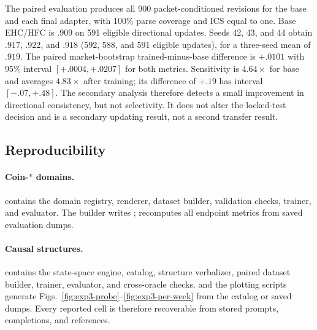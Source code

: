 The paired evaluation produces all 900 packet-conditioned revisions for the base
and each final adapter, with 100\% parse coverage and ICS equal to one. Base
EHC/HFC is $.909$ on 591 eligible directional updates. Seeds 42, 43, and 44 obtain
$.917$, $.922$, and $.918$ (592, 588, and 591 eligible updates), for a
three-seed mean of $.919$. The paired market-bootstrap trained-minus-base
difference is $+.0101$ with 95\% interval $[+.0004,+.0207]$ for both metrics.
Sensitivity is $4.64\times$ for base and averages $4.83\times$ after training;
its difference of $+.19$ has interval $[-.07,+.48]$. The secondary analysis
therefore detects a small improvement in directional consistency, but not
selectivity. It does not alter the locked-test decision and is a secondary
updating result, not a second transfer result.

\begin{center}
\begin{minipage}{.82\linewidth}
\centering
{}
\label{tab:exp3b-update-seed-results}
\scriptsize
\setlength{\tabcolsep}{4pt}
\resizebox{\linewidth}{!}{%

}
\end{minipage}
\end{center}



\subsection{Reproducibility}
\label{app:exp3-repro}

\paragraph{Coin-$*$ domains.}
 contains the domain registry,
renderer, dataset builder, validation checks, trainer, and evaluator. The builder
writes ; 
recomputes all endpoint metrics from saved evaluation dumps.

\paragraph{Causal structures.}
 contains the state-space engine,
catalog, structure verbalizer, paired dataset builder, trainer, evaluator, and
cross-oracle checks.  and the plotting scripts
generate Figs.~\ref{fig:exp3-probe}--\ref{fig:exp3-per-week} from the catalog or
saved dumps. Every reported cell is therefore recoverable from stored prompts,
completions, and references.

